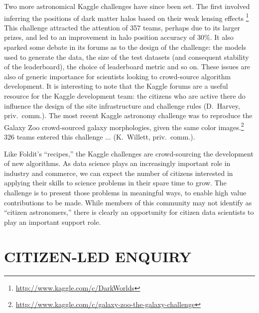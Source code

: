 \documentclass{ar2e}
\begin{document}
Two more astronomical Kaggle challenges have since been set. The first
involved inferring the positions of dark matter halos based on their weak
lensing effects
\citep{Harvey++2014}\footnote{\url{http://www.kaggle.com/c/DarkWorlds}}  This
challenge attracted the attention of 357 teams, perhaps due to its larger
prizes, and led to an improvement in halo position accuracy of 30\%.  It also
sparked some debate in its forums as to the design of the challenge: the
models used to generate the data, the size of the test datasets (and
consequent stability of the leaderboard),  the choice of leaderboard metric
and so on. These issues are also of generic importance for scientists looking
to crowd-source algorithm development. It is interesting to note that the
Kaggle forums are a useful resource for the Kaggle development team: the
citizens who are active there do influence the design of the site
infrastructure and challenge rules (D.~Harvey, priv.~comm.). The most recent
Kaggle astronomy challenge was to reproduce the Galaxy Zoo crowd-sourced
galaxy morphologies, given the same color
images.\footnote{\url{http://www.kaggle.com/c/galaxy-zoo-the-galaxy-challenge}}
326 teams entered this challenge ... (K.\ Willett, priv.\ comm.).


Like Foldit's ``recipes,'' the Kaggle challenges are crowd-sourcing the
development of new algorithms. As data science plays an increasingly important
role in industry and commerce, we can expect the number of citizens interested
in applying their skills to science problems in their spare time to grow. The
challenge is to present those problems in meaningful ways, to enable high value
contributions to be made. While members of this community may not identify as
``citizen astronomers,'' there is clearly an opportunity for citizen data
scientists to play an important support role.



\section{CITIZEN-LED ENQUIRY}
\label{sec:explore}
\end{document}
